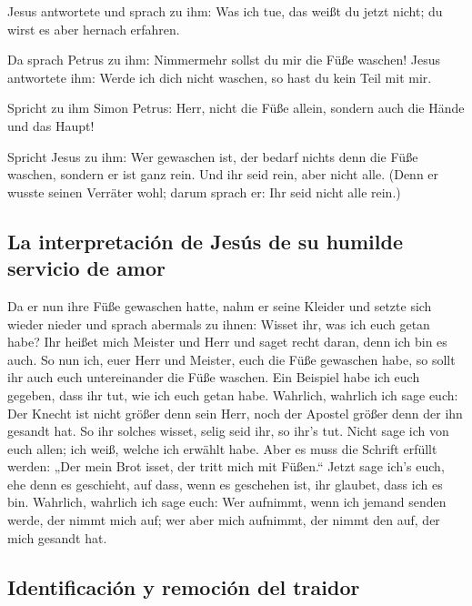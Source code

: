  Jesus antwortete und sprach zu ihm: Was ich tue, das
weißt du jetzt nicht; du wirst es aber hernach erfahren.

 Da sprach Petrus zu ihm: Nimmermehr sollst du mir die
Füße waschen! Jesus antwortete ihm: Werde ich dich nicht waschen, so
hast du kein Teil mit mir.

 Spricht zu ihm Simon Petrus: Herr, nicht die Füße allein,
sondern auch die Hände und das Haupt!

 Spricht Jesus zu ihm: Wer gewaschen ist, der bedarf
nichts denn die Füße waschen, sondern er ist ganz rein. Und ihr seid
rein, aber nicht alle.  (Denn er wusste seinen Verräter
wohl; darum sprach er: Ihr seid nicht alle rein.)

\hypertarget{la-interpretaciuxf3n-de-jesuxfas-de-su-humilde-servicio-de-amor}{%
\subsection{La interpretación de Jesús de su humilde servicio de
amor}\label{la-interpretaciuxf3n-de-jesuxfas-de-su-humilde-servicio-de-amor}}

 Da er nun ihre Füße gewaschen hatte, nahm er seine
Kleider und setzte sich wieder nieder und sprach abermals zu ihnen:
Wisset ihr, was ich euch getan habe?  Ihr heißet mich
Meister und Herr und saget recht daran, denn ich bin es auch.
 So nun ich, euer Herr und Meister, euch die Füße
gewaschen habe, so sollt ihr auch euch untereinander die Füße waschen.
 Ein Beispiel habe ich euch gegeben, dass ihr tut, wie
ich euch getan habe.  Wahrlich, wahrlich ich sage euch:
Der Knecht ist nicht größer denn sein Herr, noch der Apostel größer denn
der ihn gesandt hat.  So ihr solches wisset, selig seid
ihr, so ihr's tut.  Nicht sage ich von euch allen; ich
weiß, welche ich erwählt habe. Aber es muss die Schrift erfüllt werden:
„Der mein Brot isset, der tritt mich mit Füßen.``  Jetzt
sage ich's euch, ehe denn es geschieht, auf dass, wenn es geschehen ist,
ihr glaubet, dass ich es bin.  Wahrlich, wahrlich ich
sage euch: Wer aufnimmt, wenn ich jemand senden werde, der nimmt mich
auf; wer aber mich aufnimmt, der nimmt den auf, der mich gesandt hat.

\hypertarget{identificaciuxf3n-y-remociuxf3n-del-traidor}{%
\subsection{Identificación y remoción del
traidor}\label{identificaciuxf3n-y-remociuxf3n-del-traidor}}

